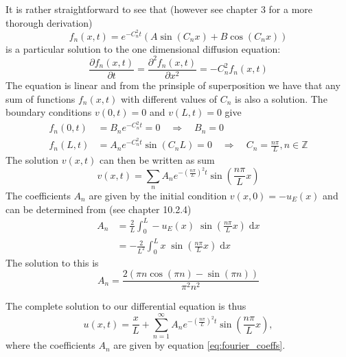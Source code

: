 \documentclass[reprint, english,notitlepage,nofootinbib]{revtex4-1}  %
\begin{document}
It is rather straightforward to see that (however see \cite{PDE_book} chapter 3 for a more thorough derivation)
\begin{equation}
\label{eq:analytic_part_sol_1D_diffusion_general}
f_n(x, t) = e^{- C_n^2 t} \left( A \sin(C_n x) + B \cos(C_n x) \right)
\end{equation}
is a particular solution to the one dimensional diffusion equation:
\begin{equation*}
\frac{\partial f_n(x, t)}{\partial t} = \frac{\partial^2 f_n(x, t)}{\partial x^2} = -C_n^2 f_n(x, t)
\end{equation*}
The equation is linear and from the prinsiple of superposition we have that any sum of functions $f_n(x, t)$ with different values of $C_n$ is also a solution. The boundary conditions $v(0, t) = 0$ and $v(L, t) = 0$ give
\begin{align*}
f_n(0, t) &= B_n e^{- C_n^2 t} = 0 \quad \Rightarrow \quad B_n = 0 \\
f_n(L, t) &= A_n e^{- C_n^2 t} \sin(C_n L) = 0 \quad \Rightarrow \quad C_n = \frac{n \pi}{L}, n \in \mathbb{Z}
\end{align*}
The solution $v(x, t)$ can then be written as sum
\begin{equation*}
v(x, t) = \sum_n A_n e^{- \left( \frac{n \pi}{L} \right)^2 t} \sin( \frac{n \pi}{L} x)
\end{equation*}
The coefficients $A_n$ are given by the initial condition $v(x, 0) = - u_E(x)$ and can be determined from (see \cite{lectures2015} chapter 10.2.4)
\begin{align*}
A_n &= \frac{2}{L} \int_0^L - u_E(x) \; \sin( \frac{n \pi}{L} x) \; \mathrm dx \\
&= - \frac{2}{L^2} \int_0^L x \; \sin( \frac{n \pi}{L} x) \; \mathrm dx
\end{align*}
The solution to this is
\begin{equation}
\label{eq:fourier_coeffs}
A_n = \dfrac{2 \left( \pi n \cos(\pi n) - \sin(\pi n) \right)}{\pi^2 n^2}
\end{equation}

The complete solution to our differential equation is thus
\begin{equation}
\label{eq:exact_solution_1D}
u(x, t) = \frac{x}{L} + \sum_{n=1}^\infty A_n e^{- \left( \frac{n \pi}{L} \right)^2 t} \sin( \frac{n \pi}{L} x),
\end{equation}
where the coefficients $A_n$ are given by equation \eqref{eq:fourier_coeffs}.
\end{document}
